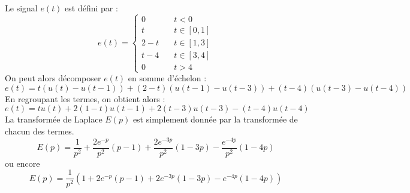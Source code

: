 Le signal $e(t)$ est défini par :
\[
e(t)=\begin{cases}
    0&\quad t<0 \\
    t&\quad t\in[0,1]\\
    2-t&\quad t\in[1,3]\\
    t-4&\quad t\in[3,4]\\
    0&\quad t>4
     \end{cases}
\]
On peut alors décomposer $e(t)$ en somme d'échelon :
\[
    e(t)=t    \left(u(t)-u(t-1)  \right)+(2-t)\left(u(t-1)-u(t-3)\right)+
         (t-4)\left(u(t-3)-u(t-4)\right) 
\]
En regroupant les termes, on obtient alors :
\[
    e(t)=tu(t)+2(1-t)u(t-1)+2(t-3)u(t-3)-(t-4)u(t-4)
\]
La transformée de Laplace $E(p)$ est simplement donnée par la transformée de
chacun des termes.
\[
    E(p)=\dfrac{1}{p^2}+\dfrac{2e^{-p}}{p^2}\left(p-1\right)
                       +\dfrac{2e^{-3p}}{p^2}\left(1-3p\right)
                       -\dfrac{e^{-4p}}{p^2}\left(1-4p\right)
\]
ou encore
\[
    E(p)=\dfrac{1}{p^2}\left(1+2e^{-p}(p-1)+2e^{-3p}(1-3p)-e^{-4p}(1-4p)\right)
\]

